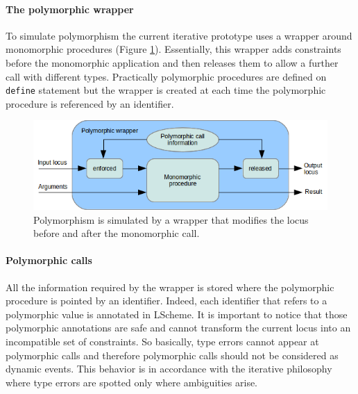 \documentclass[a4paper]{report}
\newcommand{\ischeme}[1]{\colorbox{white}{\lstinline[language=scheme]&#1&}} %
\newcommand{\reffig}[1]{(Figure \ref{#1})}
\begin{document}
\paragraph{The polymorphic wrapper} To simulate polymorphism the current iterative prototype uses a wrapper around monomorphic procedures \reffig{poly_proc}. Essentially, this wrapper adds constraints before the monomorphic application and then releases them to allow a further call with different types. Practically polymorphic procedures are defined on \ischeme{define} statement but the wrapper is created at each time the polymorphic procedure is referenced by an identifier.

\begin{figure}
\centering
\includegraphics{images/poly_proc.png}
\caption{Polymorphism is simulated by a wrapper that modifies the locus before and after the monomorphic call.}
\label{poly_proc}
\end{figure}

\paragraph{Polymorphic calls} All the information required by the wrapper is stored where the polymorphic procedure is pointed by an identifier. Indeed, each identifier that refers to a polymorphic value is annotated in LScheme. It is important to notice that those polymorphic annotations are safe and cannot transform the current locus into an incompatible set of constraints. So basically, type errors cannot appear at polymorphic calls and therefore polymorphic calls should not be considered as dynamic events. This behavior is in accordance with the iterative philosophy where type errors are spotted only where ambiguities arise.
\end{document}
